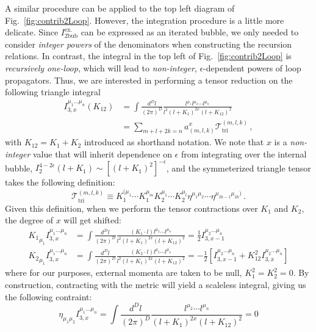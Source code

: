 \documentclass[12pt,letter]{article}
\def\Fig#1{fig.~{\ref{#1}}}
\def\Fig#1{Fig.~{\ref{#1}}}
\begin{document}
A similar procedure can be applied to the top left diagram of \Fig{fig:contrib2Loop}. However, the integration procedure is a little more delicate. Since $I^{\text{ex}.}_{\text{2bub}}$ can be expressed as an iterated bubble, we only needed to consider \textit{integer powers} of the denominators when constructing the recursion relations. In contrast, the integral in the top left of \Fig{fig:contrib2Loop} is \textit{recursively one-loop}, which will lead to \textit{non-integer}, $\epsilon$-dependent powers of loop propagators. Thus, we are interested in performing a tensor reduction on the following triangle integral
\begin{align}\label{triangleTensorInt}
     I^{\mu_1\dots \mu_n}_{3,x}(K_{12})&= \int \frac{d^D l}{(2\pi)^D} \frac{l^{\mu_1}l^{\mu_2}\cdots l^{\mu_n} }{l^2(l+K_{1})^{2x}(l+K_{12})^2}
     \\
     &= \sum_{m+l+2k=n}a^{x}_{(m,l,k)} \mathcal{T}^{(m,l,k)}_{\text{tri}}\,,
\end{align}
with $K_{12}=K_1+K_2$ introduced as shorthand notation. We note that $x$ is a \textit{non-integer} value that will inherit dependence on $\epsilon$ from integrating over the internal bubble, $I^{4-2\epsilon}_2(l+K_1)\sim [(l+K_1)^2]^{-\epsilon}$, and the symmeterized triangle tensor takes the following definition:
\begin{equation}
\mathcal{T}^{(m,l,k)}_{\text{tri}} \equiv   K_1^{(\mu_1}\cdots K_1^{\mu_m}K_2^{\mu_1}\cdots K_2^{\mu_l}\eta^{\mu_1\mu_2}\cdots \eta^{\mu_{2k-1}\mu_{2k})}\,.
\end{equation}
Given this definition, when we perform the tensor contractions over $K_1$ and $K_2$, the degree of $x$ will get shifted:
\begin{align}
{K_1}_{\mu_1}I^{\mu_1\dots \mu_n}_{3,x}&= \int \frac{d^D l}{(2\pi)^D} \frac{(K_1\cdot l)l^{\mu_2}\cdots l^{\mu_n} }{l^2(l+K_{1})^{2x}(l+K_{12})^2} = \frac{1}{2}I^{\mu_2\dots \mu_n}_{3,x-1}
\\
{K_2}_{\mu_1}I^{\mu_1\dots \mu_n}_{3,x}&= \int \frac{d^D l}{(2\pi)^D} \frac{(K_2\cdot l)l^{\mu_2}\cdots l^{\mu_n} }{l^2(l+K_{1})^{2x}(l+K_{12})^2} = -\frac{1}{2}\left[I^{\mu_2\dots \mu_n}_{3,x-1}+K_{12}^2 I^{\mu_2\dots \mu_n}_{3,x}\right]
\end{align}
where for our purposes, external momenta are taken to be null, $K_1^2=K_2^2 = 0$. By construction, contracting with the metric will yield a scaleless integral, giving us the following contraint:
\begin{equation}
\eta_{\mu_1\mu_2}I^{\mu_1\dots \mu_n}_{3,x}= \int \frac{d^D l}{(2\pi)^D}\frac{l^{\mu_2}\cdots l^{\mu_n} }{(l+K_{1})^{2x}(l+K_{12})^2} = 0
\end{equation}
\end{document}
